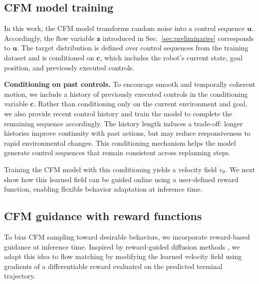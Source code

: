 \documentclass[letterpaper,10 pt,conference]{ieeeconf}
\begin{document}
\subsection{CFM model training}
In this work, the CFM model transforms random noise into a control sequence $\mathbf{u}$. 
Accordingly, the flow variable $\mathbf{z}$ introduced in Sec.~\ref{sec:preliminaries} corresponds to $\mathbf{u}$. 
The target distribution is defined over control sequences from the training dataset and is conditioned on $\mathbf{c}$, which includes the robot's current state, goal position, and previously executed controls.


\noindent\textbf{Conditioning on past controls.} 
To encourage smooth and temporally coherent motion, we include a history of previously executed controls in the conditioning variable $\mathbf{c}$. 
Rather than conditioning only on the current environment and goal, we also provide recent control history and train the model to complete the remaining sequence accordingly. 
The history length induces a trade-off: longer histories improve continuity with past actions, but may reduce responsiveness to rapid environmental changes. 
This conditioning mechanism helps the model generate control sequences that remain consistent across replanning steps.

Training the CFM model with this conditioning yields a velocity field $v_\theta$. 
We next show how this learned field can be guided online using a user-defined reward function, enabling flexible behavior adaptation at inference time.

\subsection{CFM guidance with reward functions} \label{subsec:guidance}
To bias CFM sampling toward desirable behaviors, we incorporate reward-based guidance at inference time. 
Inspired by reward-guided diffusion methods \cite{JannerDuEtAl2022}, we adapt this idea to flow matching by modifying the learned velocity field using gradients of a differentiable reward evaluated on the predicted terminal trajectory.
\end{document}

